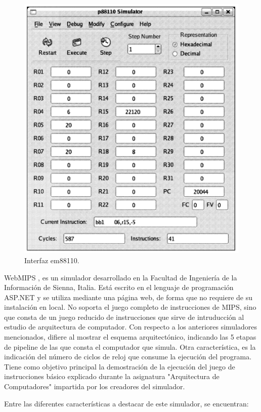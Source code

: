 \begin{figure}[htbp]
 	\centering
 	\includegraphics[width=12cm]{figures/em88110}
 	\caption{Interfaz em88110.}
	\label{fig:p88110_figure}
\end{figure}


WebMIPS \cite{branovic2004webmips}, es un simulador desarrollado en la Facultad de Ingeniería de la Información de Sienna, Italia. Está escrito en el lenguaje de programación ASP.NET y se utiliza mediante una página web, de forma que no requiere de su instalación en local. No soporta el juego completo de instrucciones de MIPS, sino que consta de un juego reducido de instrucciones que sirve de intruducción al estudio de arquitectura de computador. Con respecto a los anteriores simuladores mencionados, difiere al mostrar el esquema arquitectónico, indicando las 5 etapas de pipeline de las que consta el computador que simula. Otra característica, es la indicación del número de ciclos de reloj que consume la ejecución del programa. Tiene como objetivo principal la demostración de la ejecución del juego de instrucciones básico explicado durante la asignatura "Arquitectura de Computadores" impartida por los creadores del simulador.

Entre las diferentes características a destacar de este simulador, se encuentran:

